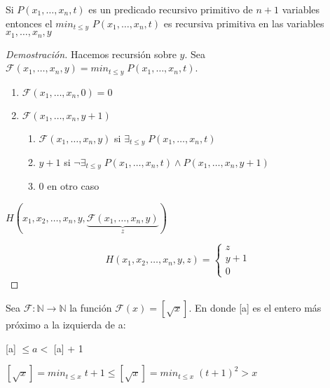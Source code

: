 \begin{proposition}
Si $P(x_1, \ldots, x_n, t)$ es un predicado recursivo primitivo de $n + 1$ variables entonces el $min_{t \leq y}$ $P(x_1, \ldots, x_n, t)$ es recursiva primitiva en las variables $x_1, \ldots, x_n, y$
\end{proposition}
 
\begin{proof}[Demostraci\'on]
Hacemos recursi\'on sobre $y$. Sea $\mathcal{F}(x_1, \ldots, x_n, y) = min_{t \leq y}\; P(x_1, \ldots, x_n, t)$.
 
\begin{enumerate}
	\item[] $\mathcal{F}(x_1, \ldots, x_n, 0) = 0$
	\item[] $\mathcal{F}(x_1, \ldots, x_n, y + 1)$
		\begin{enumerate}
			\item[] $\mathcal{F}(x_1, \ldots, x_n, y)$ si $\exists_{t \leq y}\;P(x_1, \ldots, x_n, t)$
			\item[] $y + 1$ si $\neg \exists_{t \leq y}\;P(x_1, \ldots, x_n, t) \land P(x_1, \ldots, x_n, y + 1)$			
			\item[] $0$ en otro caso
		\end{enumerate}
\end{enumerate}
 
$H(x_1, x_2, \ldots, x_n, y, \underbrace{\mathcal{F}(x_1, \ldots, x_n, y)}_{z})$
 
\[
H(x_1, x_2, \ldots, x_n, y, z) =
\begin{cases}
z			&		\\
y + 1		& 		\\
0			&
\end{cases}
\]
\end{proof}
 
\begin{example}
Sea $\mathcal{F} \colon \mathbb{N} \rightarrow \mathbb{N}$ la funci\'on $\mathcal{F}(x) = [\sqrt{x}]$. En donde [a] es el entero m\'as pr\'oximo a la izquierda de a:
 
[a] $\leq a < $ [a] + 1
 
$[\sqrt{x}] = min_{t \leq x}\;t + 1 \leq [\sqrt{x}] = min_{t \leq x} \; (t + 1)^2 > x$
\end{example}
 
